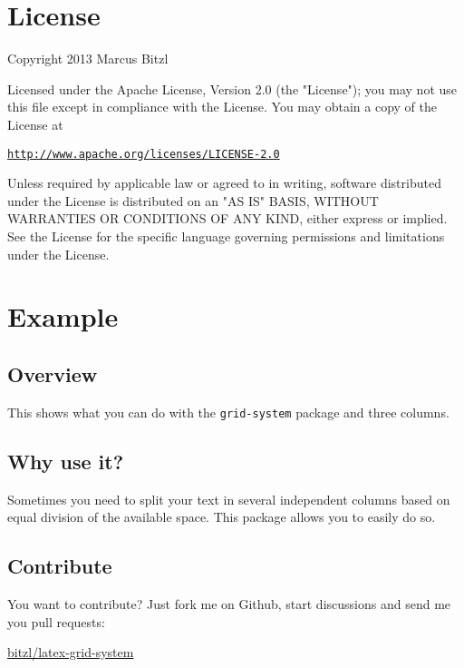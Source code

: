 \documentclass[DIV13,a4paper]{scrartcl}
\begin{document}
	
	
	\section{License}
	Copyright 2013 Marcus Bitzl
	
	\medskip
	
	Licensed under the Apache License, Version 2.0 (the "License");
	you may not use this file except in compliance with the License.
	You may obtain a copy of the License at
	
	\medskip
	
	\hspace*{1.2em}\href{http://www.apache.org/licenses/LICENSE-2.0}{\texttt{http://www.apache.org/licenses/LICENSE-2.0}}
	
	\medskip
	
	Unless required by applicable law or agreed to in writing, software
	distributed under the License is distributed on an "AS IS" BASIS,
	WITHOUT WARRANTIES OR CONDITIONS OF ANY KIND, either express or implied.
	See the License for the specific language governing permissions and
	limitations under the License.
	
	
	\section{Example}
	\begin{row}[cellsep=0.75cm]{3}{3}
		\begin{cell}{1}
			\section*{Overview}
			\vspace{-1.5ex}
			This shows what you can do with the \texttt{grid-system} package and three columns.
		\end{cell}
		\begin{cell}{1}
			\section*{Why use it?}
			\vspace{-1.5ex}
			Sometimes you need to split your text in several independent columns based on equal division of the available space. This package allows you to easily do so.
		\end{cell}
		\begin{cell}{1}
			\section*{Contribute}
			\vspace{-1.5ex}
			You want to contribute? Just fork me on Github, start discussions and send me you pull requests: 
			\begin{center}
				\href{https://github.com/bitzl/latex-grid-system}{\ttfamily bitzl/latex-grid-system}
			\end{center}
		\end{cell}
	\end{row}
	
\end{document}
